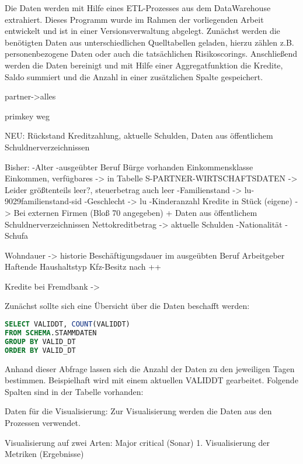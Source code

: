 Die Daten werden mit Hilfe eines ETL-Prozesses aus dem DataWarehouse extrahiert. 
Dieses Programm wurde im Rahmen der vorliegenden Arbeit entwickelt und ist in einer Versionsverwaltung abgelegt. 
Zunächst werden die benötigten Daten aus unterschiedlichen Quelltabellen geladen, hierzu zählen z.B. personenbezogene Daten oder auch die tatsächlichen Risikoscorings. 
Anschließend werden die Daten bereinigt und mit Hilfe einer Aggregatfunktion die Kredite, Saldo summiert und die Anzahl in einer zusätzlichen Spalte gespeichert.




partner->alles

primkey weg

NEU: Rückstand Kreditzahlung, aktuelle Schulden, Daten aus öffentlichem Schuldnerverzeichnissen

Bisher:
-Alter
-ausgeübter Beruf
Bürge vorhanden
Einkommensklasse
Einkommen, verfügbares -> in Tabelle S-PARTNER-WIRTSCHAFTSDATEN -> Leider größtenteils leer?, steuerbetrag auch leer
-Familienstand -> lu-9029familienstand-sid
-Geschlecht -> lu
-Kinderanzahl
Kredite in Stück (eigene) -> Bei externen Firmen (Bloß 70 angegeben) + Daten aus öffentlichem Schuldnerverzeichnissen
Nettokreditbetrag -> aktuelle Schulden
-Nationalität
-Schufa

Wohndauer -> historie
Beschäftigungsdauer im ausgeübten Beruf
Arbeitgeber
Haftende
Haushaltstyp
Kfz-Besitz
nach 
\cite{sokol2005}++

Kredite bei Fremdbank -> 




Zunächst sollte sich eine Übersicht über die Daten beschafft werden:


\begin{lstlisting}[language=SQL,caption={Überblick über die Daten},captionpos=b]
SELECT VALIDDT, COUNT(VALIDDT) 
FROM SCHEMA.STAMMDATEN 
GROUP BY VALID_DT 
ORDER BY VALID_DT
\end{lstlisting}
Anhand dieser Abfrage lassen sich die Anzahl der Daten zu den jeweiligen Tagen bestimmen. 
Beispielhaft wird mit einem aktuellen VALIDDT gearbeitet. 
Folgende Spalten sind in der Tabelle vorhanden:



Daten für die Visualisierung:
Zur Visualisierung werden die Daten aus den Prozessen verwendet. 


Visualisierung auf zwei Arten: Major critical (Sonar)
1. Visualisierung der Metriken (Ergebnisse)
